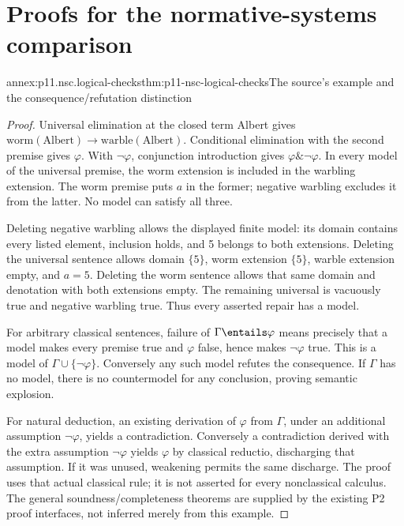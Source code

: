 \section{Proofs for the normative-systems comparison}
\label{sec:p11-annex-normative-systems-comparison}

\begin{annexitem}{annex:p11.nsc.logical-checks}{thm:p11-nsc-logical-checks}{The source's example and the consequence/refutation distinction}
\begin{proof}
Universal elimination at the closed term Albert gives
\(\mathrm{worm}(\mathrm{Albert})\to\mathrm{warble}(\mathrm{Albert})\).
Conditional elimination with the second premise gives \(\varphi\).
With \(\neg\varphi\), conjunction introduction gives
\(\varphi\mathbin{\&}\neg\varphi\). In every model of the universal
premise, the worm extension is included in the warbling extension. The
worm premise puts \(a\) in the former; negative warbling excludes it
from the latter. No model can satisfy all three.

Deleting negative warbling allows the displayed finite model: its domain
contains every listed element, inclusion holds, and 5 belongs to both
extensions. Deleting the universal sentence allows domain \(\{5\}\),
worm extension \(\{5\}\), warble extension empty, and \(a=5\).
Deleting the worm sentence allows that same domain and denotation with
both extensions empty. The remaining universal is vacuously true and
negative warbling true. Thus every asserted repair has a model.

For arbitrary classical sentences, failure of \(\Gamma\entails\varphi\)
means precisely that a model makes every premise true and \(\varphi\)
false, hence makes \(\neg\varphi\) true. This is a model of
\(\Gamma\cup\{\neg\varphi\}\). Conversely any such model refutes
the consequence. If \(\Gamma\) has no model, there is no countermodel
for any conclusion, proving semantic explosion.

For natural deduction, an existing derivation of \(\varphi\) from
\(\Gamma\), under an additional assumption \(\neg\varphi\), yields
a contradiction. Conversely a contradiction derived with the extra
assumption \(\neg\varphi\) yields \(\varphi\) by classical reductio,
discharging that assumption. If it was unused, weakening permits the
same discharge. The proof uses that actual classical rule; it is not
asserted for every nonclassical calculus. The general soundness/completeness
theorems are supplied by the existing P2 proof interfaces, not inferred
merely from this example.
\end{proof}
\end{annexitem}


